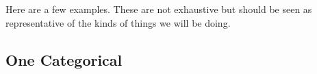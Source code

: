 \documentclass[10pt]{report}\usepackage[]{graphicx}\usepackage[]{xcolor}
\begin{document}
\newpage


\def\opt#1{#1}
\def\squeeze{\vspace*{-4ex}}

Here are a few examples. These are not exhaustive but should be seen as representative of the kinds of things we will be doing.



\begin{multicols}{3}


\subsection*{One Categorical}

\vspace*{-.15in}


\end{multicols}
\end{document}
